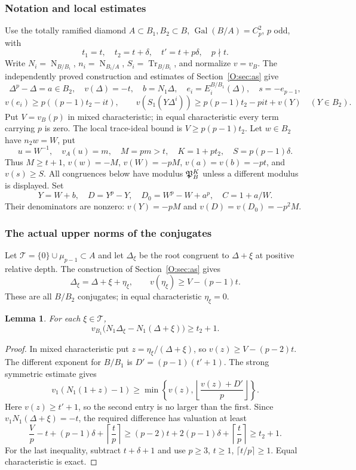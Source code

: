 \documentclass[11pt]{amsart}
\newtheorem{lemma}[theorem]{Lemma}
\theoremstyle{definition}
\theoremstyle{remark}
\newcommand{\Tr}{\operatorname{Tr}}
\newcommand{\Nm}{\operatorname{N}}
\begin{document}
\subsubsection*{Notation and local estimates}
Use the totally ramified diamond $A\subset B_1,B_2\subset B$,
$\operatorname{Gal}(B/A)=C_p^2$, $p$ odd, with
\[
 t_1=t,\quad t_2=t+\delta,\quad t'=t+p\delta,\quad p\nmid t.
\]
Write $N_i=\Nm_{B/B_i}$, $n_i=\Nm_{B_i/A}$, $S_i=\Tr_{B/B_i}$,
and normalize $v=v_B$. The independently proved construction and
estimates of Section~\ref{O:sec:as} give
\[
 \Delta^p-\Delta=a\in B_2,\quad v(\Delta)=-t,\quad
 b=N_1\Delta,\quad e_i=E_i^{B/B_1}(\Delta),\quad s=-e_{p-1},
\]
\begin{equation}\label{O:W:ledger}
 v(e_i)\ge p((p-1)t_2-it),\qquad
 v(S_1(Y\Delta^i))\ge p(p-1)t_2-pit+v(Y)\quad(Y\in B_2).
\end{equation}
Put $V=v_B(p)$ in mixed characteristic; in equal characteristic every
term carrying $p$ is zero. The local trace-ideal bound is
$V\ge p(p-1)t_2$.
Let $w\in B_2$ have $n_2w=W$, put
\[
 u=W^{-1},\quad v_A(u)=m,\quad M=pm>t,\quad
 K=1+pt_2,\quad S=p(p-1)\delta.
\]
Thus $M\ge t+1$, $v(w)=-M$, $v(W)=-pM$, $v(a)=v(b)=-pt$,
and $v(s)\ge S$. All congruences below have modulus $\mathfrak P_B^K$
unless a different modulus is displayed. Set
\[
 Y=W+b,\quad D=Y^p-Y,\quad D_0=W^p-W+a^p,\quad C=1+a/W.
\]
Their denominators are nonzero: $v(Y)=-pM$ and
$v(D)=v(D_0)=-p^2M$.

\subsubsection*{The actual upper norms of the conjugates}
Let $\mathcal T=\{0\}\cup\mu_{p-1}\subset A$ and let
$\Delta_\xi$ be the root congruent to $\Delta+\xi$ at positive
relative depth. The construction of Section~\ref{O:sec:as} gives
\[
 \Delta_\xi=\Delta+\xi+\eta_\xi,\qquad
 v(\eta_\xi)\ge V-(p-1)t.
\]
These are all $B/B_2$ conjugates; in equal characteristic
$\eta_\xi=0$.

\begin{lemma}\label{O:W:actualnorm}
For each $\xi\in\mathcal T$,
\[
 v_{B_1}\bigl(N_1\Delta_\xi-N_1(\Delta+\xi)\bigr)\ge t_2+1.
\]
\end{lemma}
\begin{proof}
In mixed characteristic put $z=\eta_\xi/(\Delta+\xi)$, so
$v(z)\ge V-(p-2)t$. The different exponent for $B/B_1$ is
$D'=(p-1)(t'+1)$. The strong symmetric estimate gives
\[
 v_1(N_1(1+z)-1)\ge
 \min\left\{v(z),\left\lfloor\frac{v(z)+D'}p\right\rfloor\right\}.
\]
Here $v(z)\ge t'+1$, so the second entry is no larger than the first.
Since $v_1N_1(\Delta+\xi)=-t$, the required difference has valuation
at least
\[
 \frac Vp-t+(p-1)\delta+\left\lceil\frac tp\right\rceil
 \ge (p-2)t+2(p-1)\delta+\left\lceil\frac tp\right\rceil
 \ge t_2+1.
\]
For the last inequality, subtract $t+\delta+1$ and use $p\ge3$,
$t\ge1$, $\lceil t/p\rceil\ge1$. Equal characteristic is exact.
\end{proof}
\end{document}
